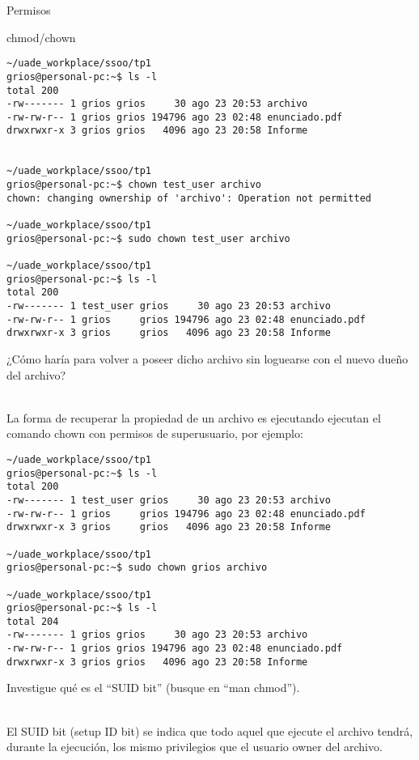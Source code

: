\begin{section}{Permisos}
\begin{subsection}{chmod/chown}
\begin{lstlisting}[style=Ubuntu]
~/uade_workplace/ssoo/tp1
grios@personal-pc:~$ ls -l                     
total 200
-rw------- 1 grios grios     30 ago 23 20:53 archivo
-rw-rw-r-- 1 grios grios 194796 ago 23 02:48 enunciado.pdf
drwxrwxr-x 3 grios grios   4096 ago 23 20:58 Informe


~/uade_workplace/ssoo/tp1
grios@personal-pc:~$ chown test_user archivo
chown: changing ownership of 'archivo': Operation not permitted

~/uade_workplace/ssoo/tp1
grios@personal-pc:~$ sudo chown test_user archivo

~/uade_workplace/ssoo/tp1
grios@personal-pc:~$ ls -l
total 200
-rw------- 1 test_user grios     30 ago 23 20:53 archivo
-rw-rw-r-- 1 grios     grios 194796 ago 23 02:48 enunciado.pdf
drwxrwxr-x 3 grios     grios   4096 ago 23 20:58 Informe

\end{lstlisting}

\begin{quoting}
¿Cómo haría para volver a poseer dicho archivo sin loguearse con el nuevo dueño del archivo?
\end{quoting}
\\
La forma de recuperar la propiedad de un archivo es ejecutando ejecutan el comando chown con permisos de superusuario, por ejemplo:

\begin{lstlisting}[style=Ubuntu]
~/uade_workplace/ssoo/tp1
grios@personal-pc:~$ ls -l
total 200
-rw------- 1 test_user grios     30 ago 23 20:53 archivo
-rw-rw-r-- 1 grios     grios 194796 ago 23 02:48 enunciado.pdf
drwxrwxr-x 3 grios     grios   4096 ago 23 20:58 Informe

~/uade_workplace/ssoo/tp1
grios@personal-pc:~$ sudo chown grios archivo

~/uade_workplace/ssoo/tp1
grios@personal-pc:~$ ls -l
total 204
-rw------- 1 grios grios     30 ago 23 20:53 archivo
-rw-rw-r-- 1 grios grios 194796 ago 23 02:48 enunciado.pdf
drwxrwxr-x 3 grios grios   4096 ago 23 20:58 Informe

\end{lstlisting}

\begin{quoting}
Investigue qué es el “SUID bit” (busque en “man chmod”).
\end{quoting}\\
El SUID bit (setup ID bit) se indica que todo aquel que ejecute el archivo tendrá, durante la ejecución, los mismo privilegios que el usuario owner del archivo.\\


\end{subsection}
\end{section}

